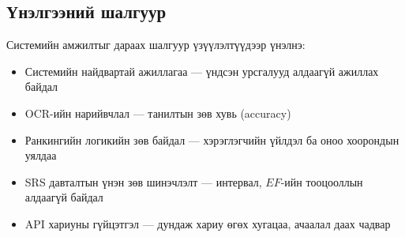 \subsection{Үнэлгээний шалгуур}

Системийн амжилтыг дараах шалгуур үзүүлэлтүүдээр үнэлнэ:

\begin{itemize}[leftmargin=2em]
    \item Системийн найдвартай ажиллагаа --- үндсэн урсгалууд алдаагүй ажиллах байдал
    \item OCR-ийн нарийвчлал --- танилтын зөв хувь (accuracy)
    \item Ранкингийн логикийн зөв байдал --- хэрэглэгчийн үйлдэл ба оноо хоорондын уялдаа
    \item SRS давталтын үнэн зөв шинэчлэлт --- интервал, $EF$-ийн тооцооллын алдаагүй байдал
    \item API хариуны гүйцэтгэл --- дундаж хариу өгөх хугацаа, ачаалал даах чадвар
\end{itemize}